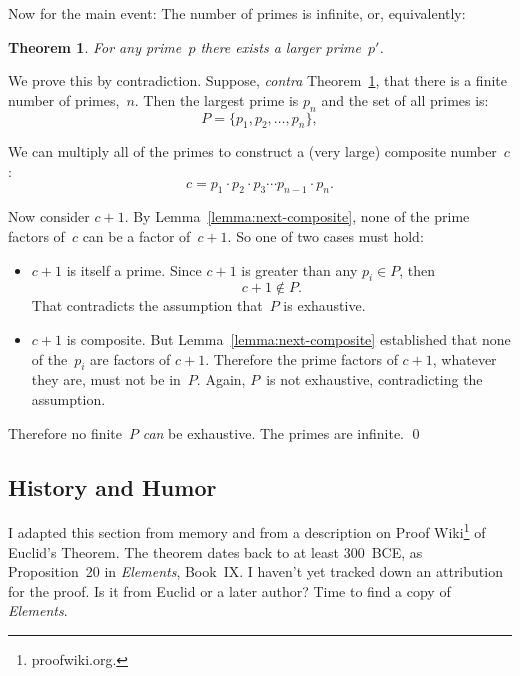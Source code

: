 \documentclass[twocolumn]{article}
\newtheorem{theorem}{Theorem}
\begin{document}
Now for the main event:
The number of primes is infinite, or, equivalently:
\begin{theorem}
\label{theorem:unbounded-primes}
For any prime~$p$ there exists a larger prime~$p'$.
\end{theorem}

We prove this by contradiction.
Suppose, \textit{contra} Theorem~\ref{theorem:unbounded-primes}, that
there is a finite number of primes,~$n$.
Then the largest prime is $p_n$ and the set of all primes is:
\begin{equation*}
P = \{ p_1, p_2, \ldots, p_n \},
\end{equation*}

We can multiply all of the primes to construct a (very
large) composite number~$c$:
\begin{equation}
c = p_1 \cdot p_2 \cdot p_3 \cdots p_{n-1} \cdot p_n.
\end{equation}

Now consider $c+1$.
By Lemma~\ref{lemma:next-composite}, none of the prime factors of~$c$
can be a factor of~$c+1$.
So one of two cases must hold:
\begin{itemize}
\item $c+1$ is itself a prime.
Since $c+1$ is greater than any $p_i \in P$,
then
\begin{equation}
c+1 \notin P.
\end{equation}
That contradicts the assumption that~$P$ is exhaustive.
\item $c+1$ is composite.
But Lemma~\ref{lemma:next-composite} established that none of
the~$p_i$ are factors of $c+1$.
Therefore the prime factors of $c+1$, whatever they are, must not be
in~$P$.
Again, $P$~is not exhaustive, contradicting the assumption.
\end{itemize}

Therefore no finite~$P$ \emph{can} be exhaustive. The primes are
infinite. \qed

\subsection{History and Humor}

I adapted this section from memory and from a description on Proof
Wiki\footnote{proofwiki.org.} of Euclid's Theorem.
The theorem dates back to at least 300~BCE, as Proposition~20 in
\textit{Elements}, Book~IX.
I haven't yet tracked down an attribution for the proof.  Is it from
Euclid or a later author?  Time to find a copy of \textit{Elements}.
\end{document}
